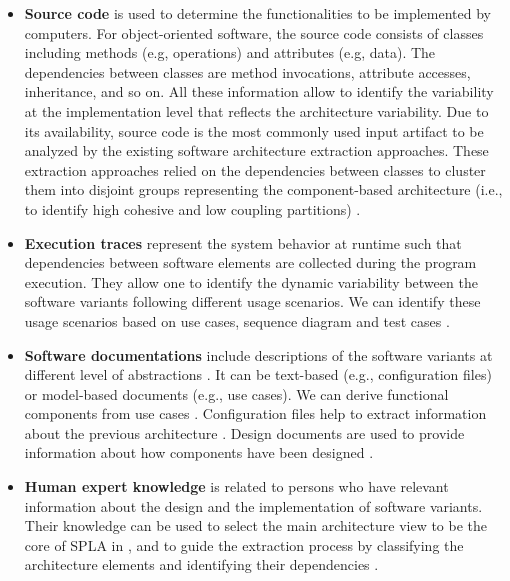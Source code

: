 \documentclass[graybox]{svmult}
\begin{document}
\begin{itemize}
	\item \textbf{Source code} is used to determine the functionalities to be implemented by computers. For object-oriented software, the source code consists of classes including methods (e.g, operations) and attributes (e.g, data). The dependencies between classes are method invocations, attribute accesses, inheritance, and so on. All these information allow to identify the variability at the implementation level that reflects the architecture variability. Due to its availability, source code is the most commonly used input artifact to be analyzed by the existing software architecture extraction approaches. These extraction approaches relied on the dependencies between classes to cluster them into disjoint groups representing the component-based architecture (i.e., to identify high cohesive and low coupling partitions) \cite{mende2008supporting,mende2009evaluation,moshkenani2012improving}. 
	
    \item \textbf{Execution traces} represent the system behavior at runtime such that dependencies between software elements are collected during the program execution. They allow one to identify the dynamic variability  between the software variants following different usage scenarios. We can identify these  usage scenarios based on use cases, sequence diagram and test cases \cite{allier2009identifying,Dugerdil:2013:DDT:2480362.2480602,mishra2009creating}. 
    
	\item \textbf{Software documentations} include descriptions of the software variants at different level of abstractions \cite{lethbridge2003software}. It can be text-based (e.g., configuration files) or model-based documents (e.g., use cases). We can derive functional components from use cases \cite{allier2009identifying}. Configuration files help to extract information about the previous architecture \cite{Weinreich2012}. Design documents are used to provide information about how components have been designed \cite{kolb2006refactoring}. 
	
	\item \textbf{Human expert knowledge} is related to persons who have relevant information about the design and the implementation of software variants. Their knowledge can be used to select the main architecture view to be the core of SPLA in \cite{pinzger2004architecture}, and to guide the extraction process by classifying the architecture elements and identifying their dependencies \cite{kang2005feature}. 

\end{itemize}
\end{document}
